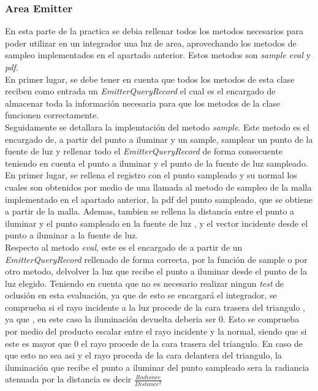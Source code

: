 \documentclass[10pt,oneside,a4paper]{article}
\begin{document}
\subsubsection{Area Emitter}
En esta parte de la practica se debia rellenar todos los metodos necesarios para poder utilizar en un integrador una luz de area, aprovechando los metodos de sampleo implementados en el apartado anterior. Estos metodos son \textit{sample} \textit{eval} y \textit{pdf}.\\

En primer lugar, se debe tener en cuenta que todos los metodos de esta clase reciben como entrada un \textit{EmitterQueryRecord} el cual es el encargado de almacenar toda la información necesaria para que los metodos de la clase funcionen correctamente.\\

Seguidamente se detallara la implemtación del metodo \textit{sample}. Este metodo es el encargado de, a partir del punto a iluminar y un sample, samplear un punto de la fuente de luz y rellenar todo el \textit{EmitterQueryRecord} de forma consecuente teniendo en cuenta el punto a iluminar y el punto de la fuente de luz sampleado. En primer lugar, se rellena el registro con el punto sampleado y su normal los cuales son obtenidos por medio de una llamada al metodo de sampleo de la malla implementado en el apartado anterior, la pdf del punto sampleado, que se obtiene a partir de la malla. Ademas, tambien se rellena la distancia entre el punto a iluminar y el punto sampleado en la fuente de luz , y el vector incidente desde el punto a iluminar a la fuente de luz.\\

Respecto al metodo \textit{eval}, este es el encargado de a partir de un \textit{EmitterQueryRecord} rellenado de forma correcta, por la función de sample o por otro metodo, delvolver la luz que recibe el punto a iluminar desde el punto de la luz elegido. Teniendo en cuenta que no es necesario realizar ningun \textit{test} de oclusión en esta evaluación, ya que de esto se encargará el integrador, se comprueba si el rayo incidente a la luz procede de la cara trasera del triangulo , ya que , en este caso la iluminación devuelta deberia ser 0. Esto se comprueba por medio del producto escalar entre el rayo incidente y la normal, siendo que si este es mayor que 0 el rayo procede de la cara trasera del triangulo. En caso de que esto no sea asi y el rayo proceda de la cara delantera del triangulo, la iluminación que recibe el punto a iluminar del punto sampleado sera la radiancia atenuada por la distancia es decir $\frac{Radiance}{Distance^2}$
\end{document}
